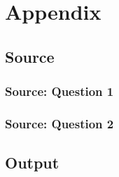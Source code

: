 \documentclass{article}
\begin{document}
\newpage

\section{Appendix}

\subsection{Source}

\subsubsection{Source: Question 1}



\newpage

\subsubsection{Source: Question 2}



\newpage

\subsection{Output}


\end{document}
